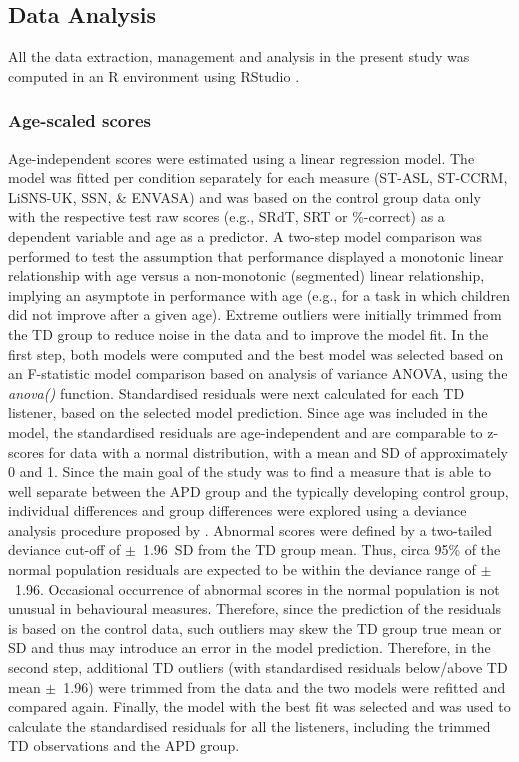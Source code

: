 \documentclass[a4paper, twoside]{templates/ociamthesis}
\begin{document}
\hypertarget{data-analysis}{%
\subsection{Data Analysis}\label{data-analysis}}

All the data extraction, management and analysis in the present study was computed in an R environment \autocite[Version 4.0.3;][]{RCore} using RStudio \autocite[Version 1.4.938;][]{RStudio}.\\

\hypertarget{z-scores}{%
\subsubsection{Age-scaled scores}\label{z-scores}}

Age-independent scores were estimated using a linear regression model. The model was fitted per condition separately for each measure (ST-ASL, ST-CCRM, LiSNS-UK, SSN, \& ENVASA) and was based on the control group data only with the respective test raw scores (e.g., SRdT, SRT or \%-correct) as a dependent variable and age as a predictor. A two-step model comparison was performed to test the assumption that performance displayed a monotonic linear relationship with age versus a non-monotonic (segmented) linear relationship, implying an asymptote in performance with age (e.g., for a task in which children did not improve after a given age). Extreme outliers were initially trimmed from the TD group to reduce noise in the data and to improve the model fit. In the first step, both models were computed and the best model was selected based on an F-statistic model comparison based on analysis of variance ANOVA, using the \emph{anova()} function. Standardised residuals were next calculated for each TD listener, based on the selected model prediction. Since age was included in the model, the standardised residuals are age-independent and are comparable to z-scores for data with a normal distribution, with a mean and SD of approximately 0 and 1. Since the main goal of the study was to find a measure that is able to well separate between the APD group and the typically developing control group, individual differences and group differences were explored using a deviance analysis procedure proposed by \textcite{Ramus2003}. Abnormal scores were defined by a two-tailed deviance cut-off of \(\pm\)~1.96~SD from the TD group mean. Thus, circa 95\% of the normal population residuals are expected to be within the deviance range of \(\pm\)~1.96. Occasional occurrence of abnormal scores in the normal population is not unusual in behavioural measures. Therefore, since the prediction of the residuals is based on the control data, such outliers may skew the TD group true mean or SD and thus may introduce an error in the model prediction. Therefore, in the second step, additional TD outliers (with standardised residuals below/above TD mean \(\pm\)~1.96) were trimmed from the data and the two models were refitted and compared again. Finally, the model with the best fit was selected and was used to calculate the standardised residuals for all the listeners, including the trimmed TD observations and the APD group.
\end{document}
